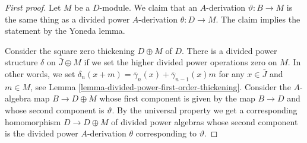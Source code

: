 \begin{proof}[First proof]
Let $M$ be a $D$-module. We claim that an $A$-derivation
$\vartheta : B \to M$ is the same thing as a divided power
$A$-derivation $\theta : D \to M$. The claim implies the
statement by the Yoneda lemma.

\medskip\noindent
Consider the square zero thickening $D \oplus M$ of $D$.
There is a divided power structure $\delta$ on $\bar J \oplus M$
if we set the higher divided power operations zero on $M$.
In other words, we set
$\delta_n(x + m) = \bar\gamma_n(x) + \bar\gamma_{n - 1}(x)m$ for
any $x \in \bar J$ and $m \in M$, see
Lemma \ref{lemma-divided-power-first-order-thickening}.
Consider the $A$-algebra map $B \to D \oplus M$ whose first
component is given by the map $B \to D$ and whose second component
is $\vartheta$. By the universal property we get a corresponding
homomorphism $D \to D \oplus M$ of divided power algebras
whose second component is the divided power
$A$-derivation $\theta$ corresponding to $\vartheta$.
\end{proof}

